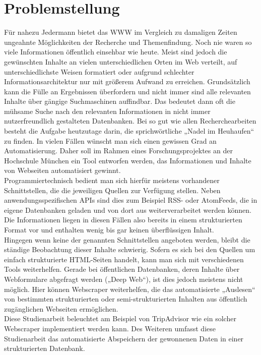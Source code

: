 \documentclass[a4paper,oneside,12pt]{report}
\begin{document}
	


	\newpage
	\tableofcontents
	
	
	
	
	
	\chapter[Problemstellung - Johannes Knippel]{Problemstellung}\label{probstellung}
	
		Für nahezu Jedermann bietet das WWW im Vergleich zu damaligen Zeiten ungeahnte Möglichkeiten der Recherche und Themenfindung. Noch nie waren so viele Informationen öffentlich einsehbar wie heute. Meist sind jedoch die gewünschten Inhalte an vielen unterschiedlichen Orten im Web verteilt, auf unterschiedlichste Weisen formatiert oder aufgrund schlechter Informationsarchitektur nur mit größerem Aufwand zu erreichen. Grundsätzlich kann die Fülle an Ergebnissen überfordern und nicht immer sind alle relevanten Inhalte über gängige Suchmaschinen auffindbar. Das bedeutet dann oft die mühsame Suche nach den relevanten Informationen in nicht immer nutzerfreundlich gestalteten Datenbanken. Bei so gut wie allen Recherchearbeiten besteht die Aufgabe heutzutage darin, die sprichwörtliche „Nadel im Heuhaufen“ zu finden. In vielen Fällen wünscht man sich einen gewissen Grad an Automatisierung. Daher soll im Rahmen eines Forschungsprojektes an der Hochschule München ein Tool entworfen werden, das Informationen und Inhalte von Webseiten automatisiert gewinnt. 
		\\
		Programmiertechnisch bedient man sich hierfür meistens vorhandener Schnittstellen, die die jeweiligen Quellen zur Verfügung stellen. Neben anwendungsspezifischen APIs sind dies zum Beispiel RSS- oder AtomFeeds, die in eigene Datenbanken geladen und von dort aus weiterverarbeitet werden können. \cite{bib-atomfeed} Die Informationen liegen in diesen Fällen also bereits in einem strukturierten Format vor und enthalten wenig bis gar keinen überflüssigen Inhalt.
		\\
		Hingegen wenn keine der genannten Schnittstellen angeboten werden, bleibt die ständige Beobachtung dieser Inhalte schwierig. Sofern es sich bei den Quellen um einfach strukturierte HTML-Seiten handelt, kann man sich mit verschiedenen Tools weiterhelfen. Gerade bei öffentlichen Datenbanken, deren Inhalte über Webformulare abgefragt werden („Deep Web“), ist dies jedoch meistens nicht möglich. \cite{bib-deepweb} Hier können Webscraper weiterhelfen, die das automatisierte „Auslesen“ von bestimmten strukturierten	oder semi-strukturierten Inhalten aus öffentlich zugänglichen Webseiten ermöglichen. 
		\\
		\newline
		Diese Studienarbeit beleuchtet am Beispiel von TripAdvisor wie ein solcher Webscraper implementiert werden kann. Des Weiteren umfasst diese Studienarbeit das automatisierte Abspeichern der gewonnenen Daten in einer strukturierten Datenbank.
		
\end{document}
